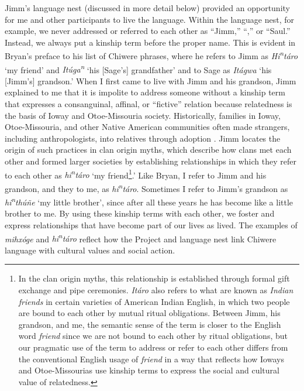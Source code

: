 \documentclass[output=paper]{LSP/langsci}
\begin{document}
Jimm's language nest (discussed in more detail below) provided an opportunity for me and other participants to live the language. Within the language nest, for example, we never addressed or referred to each other as ``Jimm,'' ``,'' or ``Saul.'' Instead, we always put a kinship term before the proper name. This is evident in Bryan's preface to his list of Chiwere phrases, where he refers to Jimm as \emph{Hi\textsuperscript{n}t\'aro} `my friend' and \emph{It\'uga\textsuperscript{n}} `his [Sage's] grandfather' and to Sage as \emph{It\'agwa} `his [Jimm's] grandson.' When I first came to live with Jimm and his grandson, Jimm explained to me that it is impolite to address someone without a kinship term that expresses a consanguinal, affinal, or ``fictive'' relation because relatedness is the basis of Ioway and Otoe-Missouria society. Historically, families in Ioway, Otoe-Missouria, and other Native American communities often made strangers, including anthropologists, into relatives through adoption \citep[see e.g.][]{Kan2001}. Jimm locates the origin of such practices in clan origin myths, which describe how clans met each other and formed larger societies by establishing relationships in which they refer to each other as \emph{hi\textsuperscript{n}t\'aro} `my friend\footnote{In the clan origin myths, this relationship is established through formal gift exchange and pipe ceremonies. \emph{It\'aro} also refers to what are known as \emph{Indian friends} in certain varieties of American Indian English, in which two people are bound to each other by mutual ritual obligations. Between Jimm, his grandson, and me, the semantic sense of the term is closer to the English word \emph{friend} since we are not bound to each other by ritual obligations, but our pragmatic use of the term to address or refer to each other differs from the conventional English usage of \emph{friend} in a way that reflects how Ioways and Otoe-Missourias use kinship terms to express the social and cultural value of relatedness.}.' Like Bryan, I refer to Jimm and his grandson, and they to me, as \emph{hi\textsuperscript{n}t\'aro}. Sometimes I refer to Jimm's grandson as \emph{hi\textsuperscript{n}th\'u\~ne} `my little brother', since after all these years he has become like a little brother to me. By using these kinship terms with each other, we foster and express relationships that have become part of our lives as lived. The examples of \emph{mihx\'oge} and \emph{hi\textsuperscript{n}t\'aro} reflect how the Project and language nest link Chiwere language with cultural values and social action.
\end{document}
